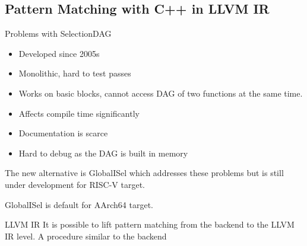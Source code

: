 \subsection{Pattern Matching with C++ in LLVM IR}
\begin{frame}{Problems with SelectionDAG}
    \begin{itemize}
        \item Developed since 2005s
        \item Monolithic, hard to test passes
        \item Works on basic blocks, cannot access DAG of two functions at the same time.
        \item Affects compile time significantly
        \item Documentation is scarce
        \item Hard to debug as the DAG is built in memory
    \end{itemize}
    The new alternative is GlobalISel which addresses these problems but is still under development for RISC-V target.

    GlobalISel is default for AArch64 target.
\end{frame}

\begin{frame}{LLVM IR}
It is possible to lift pattern matching from the backend to the LLVM IR level. A procedure similar to the backend 
\end{frame}
